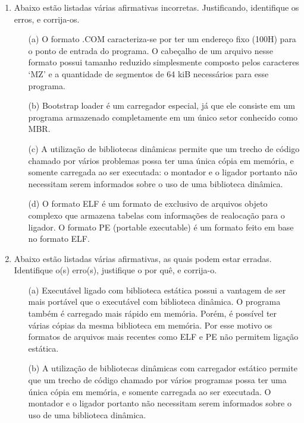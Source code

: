 \begin{enumerate}
    \item
    Abaixo estão listadas várias afirmativas incorretas.
    Justificando, identifique os erros, e corrija-os.
    \begin{itemize}
        \item [(a)]
        O formato .COM caracteriza-se por ter um endereço fixo (100H)
        para o ponto de entrada do programa.
        O cabeçalho de um arquivo nesse formato possui tamanho reduzido simplesmente
        composto pelos caracteres `MZ' e 
        a quantidade de segmentos de 64 kiB necessários para esse programa.

        \item [(b)]
        Bootstrap loader é um carregador especial, já que ele consiste em um programa
        armazenado completamente em um único setor conhecido como MBR.

        \item [(c)]
        A utilização de bibliotecas dinâmicas permite que um trecho de código 
        chamado por vários problemas possa ter uma única cópia em memória,
        e somente carregada ao ser executada: 
        o montador e o ligador portanto não necessitam serem informados 
        sobre o uso de uma biblioteca dinâmica.

        \item [(d)]
        O formato ELF é um formato de exclusivo de arquivos objeto complexo 
        que armazena tabelas com informações de realocação para o ligador.
        O formato PE (portable executable) é um formato feito em base no formato ELF.
    \end{itemize} 

    \item 
    Abaixo estão listadas várias afirmativas, as quais podem estar erradas.
    Identifique o(s) erro(s), justifique o por quê, e corrija-o.
    \begin{itemize}
        \item [(a)]
        Executável ligado com biblioteca estática 
        possui a vantagem de ser mais portável
        que o executável com biblioteca dinâmica.
        O programa também é carregado mais rápido em memória.
        Porém, é possível ter várias cópias da mesma biblioteca em memória.
        Por esse motivo os formatos de arquivos mais recentes 
        como ELF e PE não permitem ligação estática.

        \item [(b)]
        A utilização de bibliotecas dinâmicas com carregador estático 
        permite que um trecho de código chamado por vários programas 
        possa ter uma única cópia em memória, e somente carregada ao ser executada.
        O montador e o ligador portanto não necessitam 
        serem informados sobre o uso de uma biblioteca dinâmica. 
    \end{itemize}


\end{enumerate}
